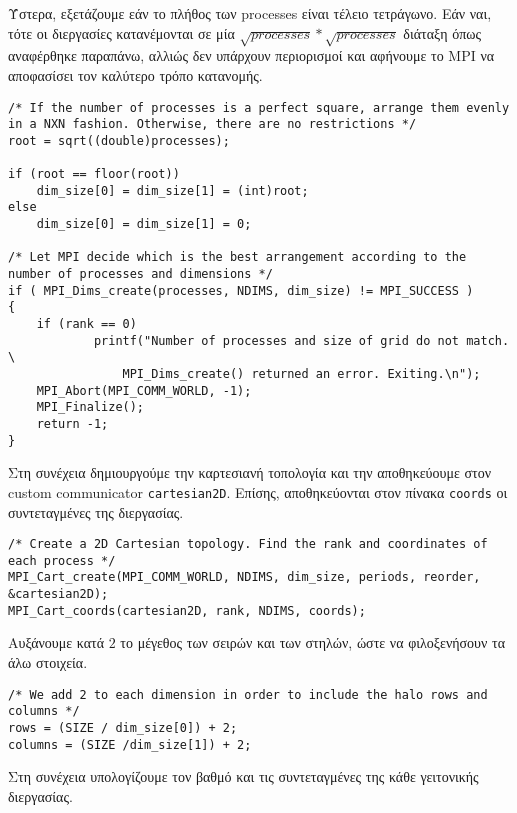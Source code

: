 Ύστερα, εξετάζουμε εάν το πλήθος των processes είναι τέλειο τετράγωνο. Εάν ναι, τότε οι διεργασίες κατανέμονται σε μία $\sqrt{processes} * \sqrt{processes}$ διάταξη όπως αναφέρθηκε παραπάνω, αλλιώς δεν υπάρχουν περιορισμοί και αφήνουμε το MPI να αποφασίσει τον καλύτερο τρόπο κατανομής.

\begin{tcolorbox}
\begin{verbatim}
/* If the number of processes is a perfect square, arrange them evenly in a NXN fashion. Otherwise, there are no restrictions */
root = sqrt((double)processes);

if (root == floor(root))
    dim_size[0] = dim_size[1] = (int)root;
else
    dim_size[0] = dim_size[1] = 0;

/* Let MPI decide which is the best arrangement according to the number of processes and dimensions */
if ( MPI_Dims_create(processes, NDIMS, dim_size) != MPI_SUCCESS )
{
    if (rank == 0)
            printf("Number of processes and size of grid do not match. \
                MPI_Dims_create() returned an error. Exiting.\n");
    MPI_Abort(MPI_COMM_WORLD, -1);
    MPI_Finalize();
    return -1;
}
\end{verbatim}
\end{tcolorbox}

Στη συνέχεια δημιουργούμε την καρτεσιανή τοπολογία και την αποθηκεύουμε στον custom communicator \texttt{cartesian2D}. Επίσης, αποθηκεύονται στον πίνακα \texttt{coords} οι συντεταγμένες της διεργασίας.

\begin{tcolorbox}
\begin{verbatim}
/* Create a 2D Cartesian topology. Find the rank and coordinates of each process */
MPI_Cart_create(MPI_COMM_WORLD, NDIMS, dim_size, periods, reorder, &cartesian2D);
MPI_Cart_coords(cartesian2D, rank, NDIMS, coords);
\end{verbatim}
\end{tcolorbox}

Αυξάνουμε κατά $2$ το μέγεθος των σειρών και των στηλών, ώστε να φιλοξενήσουν τα άλω στοιχεία.
\begin{tcolorbox}
\begin{verbatim}
/* We add 2 to each dimension in order to include the halo rows and columns */
rows = (SIZE / dim_size[0]) + 2;
columns = (SIZE /dim_size[1]) + 2;
\end{verbatim}
\end{tcolorbox}

Στη συνέχεια υπολογίζουμε τον βαθμό και τις συντεταγμένες της κάθε γειτονικής διεργασίας.

